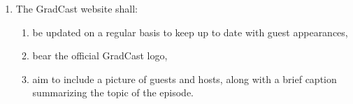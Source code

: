 \begin{enumerate} [label*=\arabic*., align=left]
\begin{enumerate}
campus, the general community
\item maintain episodes at approximately 30 minutes in length on a weekly basis or as
designated by CHRW
\item maintain at least one (1) pre-recorded podcast episode to maintain a weekly schedule
as needed should circumstance arise.
\item be comprised of at least one (1) student guest per episode.
\end{enumerate}
\item The GradCast website shall:
\begin{enumerate}
\item be updated on a regular basis to keep up to date with guest appearances,
\item bear the official GradCast logo,
\item aim to include a picture of guests and hosts, along with a brief caption summarizing the topic
of the episode.
\end{enumerate}
\end{enumerate}
